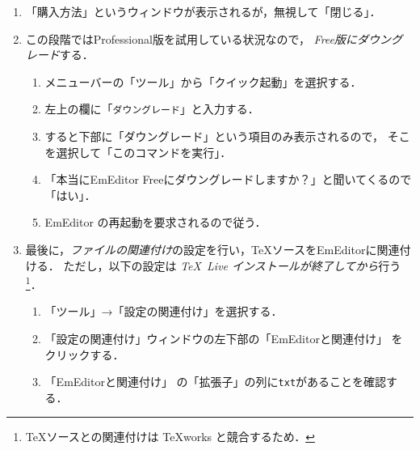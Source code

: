 \documentclass{ltjsarticle}
\begin{document}
\begin{enumerate}
\item 「購入方法」というウィンドウが表示されるが，無視して「閉じる」．
\item この段階ではProfessional版を試用している状況なので，
  \emph{Free版にダウングレード}する．

  \begin{enumerate}
  \item %
    メニューバーの「ツール」から「クイック起動」を選択する．
  \item 左上の欄に「\texttt{ダウングレード}」と入力する．
  \item すると下部に「ダウングレード」という項目のみ表示されるので，
    そこを選択して「このコマンドを実行」．
  \item 「本当にEmEditor Freeにダウングレードしますか？」と聞いてくるので「はい」．
  \item EmEditor の再起動を要求されるので従う．
  \end{enumerate}

\item 最後に，\emph{ファイルの関連付け}の設定を行い，\TeX ソースをEmEditorに関連付ける．
  ただし，以下の設定は \emph{\TeX~Live インストールが終了してから}行う\footnote{\TeX ソースとの関連付けは \TeX works と競合するため．}．
  \begin{enumerate}
  \item 「ツール」→「設定の関連付け」を選択する．%


  \item 「設定の関連付け」ウィンドウの左下部の「EmEditorと関連付け」
    をクリックする．%

  \item 「EmEditorと関連付け」%
    の「拡張子」の列に\texttt{txt}があることを確認する．


\end{enumerate}
\end{enumerate}
\end{document}
